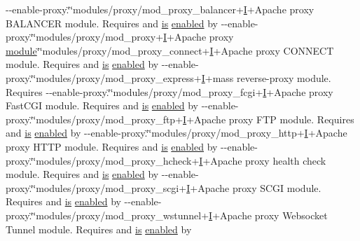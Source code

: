 \begin{DoxyCompactItemize}
-\/-\/enable-\/proxy.\char`\"{}\char`\"{}modules/proxy/mod\+\_\+proxy\+\_\+balancer+\hyperlink{apr__md5_8c_ac0eafdc9ee161b71e7af98af736952fd}{I}+Apache proxy B\+A\+L\+A\+N\+C\+ER module.  Requires and \hyperlink{NON-AUTOTOOLS-BUILD_8txt_a2569119f3fd3f0d7d7ecea3c96acb0bf}{is} \hyperlink{group__APR__Util__Bucket__Brigades_ga03e6cca0c879c0443efb431c30c14f76}{enabled} by -\/-\/enable-\/proxy.\char`\"{}\char`\"{}modules/proxy/mod\+\_\+proxy+\hyperlink{apr__md5_8c_ac0eafdc9ee161b71e7af98af736952fd}{I}+Apache proxy \hyperlink{group__APACHE__CORE__CONFIG_ga0ea4f633a5f9f88e1603aaeb1f2b2e69}{module}\char`\"{}\char`\"{}modules/proxy/mod\+\_\+proxy\+\_\+connect+\hyperlink{apr__md5_8c_ac0eafdc9ee161b71e7af98af736952fd}{I}+Apache proxy C\+O\+N\+N\+E\+CT module.  Requires and \hyperlink{NON-AUTOTOOLS-BUILD_8txt_a2569119f3fd3f0d7d7ecea3c96acb0bf}{is} \hyperlink{group__APR__Util__Bucket__Brigades_ga03e6cca0c879c0443efb431c30c14f76}{enabled} by -\/-\/enable-\/proxy.\char`\"{}\char`\"{}modules/proxy/mod\+\_\+proxy\+\_\+express+\hyperlink{apr__md5_8c_ac0eafdc9ee161b71e7af98af736952fd}{I}+mass reverse-\/proxy module. Requires -\/-\/enable-\/proxy.\char`\"{}\char`\"{}modules/proxy/mod\+\_\+proxy\+\_\+fcgi+\hyperlink{apr__md5_8c_ac0eafdc9ee161b71e7af98af736952fd}{I}+Apache proxy Fast\+C\+GI module.  Requires and \hyperlink{NON-AUTOTOOLS-BUILD_8txt_a2569119f3fd3f0d7d7ecea3c96acb0bf}{is} \hyperlink{group__APR__Util__Bucket__Brigades_ga03e6cca0c879c0443efb431c30c14f76}{enabled} by -\/-\/enable-\/proxy.\char`\"{}\char`\"{}modules/proxy/mod\+\_\+proxy\+\_\+ftp+\hyperlink{apr__md5_8c_ac0eafdc9ee161b71e7af98af736952fd}{I}+Apache proxy F\+TP module.  Requires and \hyperlink{NON-AUTOTOOLS-BUILD_8txt_a2569119f3fd3f0d7d7ecea3c96acb0bf}{is} \hyperlink{group__APR__Util__Bucket__Brigades_ga03e6cca0c879c0443efb431c30c14f76}{enabled} by -\/-\/enable-\/proxy.\char`\"{}\char`\"{}modules/proxy/mod\+\_\+proxy\+\_\+http+\hyperlink{apr__md5_8c_ac0eafdc9ee161b71e7af98af736952fd}{I}+Apache proxy H\+T\+TP module.  Requires and \hyperlink{NON-AUTOTOOLS-BUILD_8txt_a2569119f3fd3f0d7d7ecea3c96acb0bf}{is} \hyperlink{group__APR__Util__Bucket__Brigades_ga03e6cca0c879c0443efb431c30c14f76}{enabled} by -\/-\/enable-\/proxy.\char`\"{}\char`\"{}modules/proxy/mod\+\_\+proxy\+\_\+hcheck+\hyperlink{apr__md5_8c_ac0eafdc9ee161b71e7af98af736952fd}{I}+Apache proxy health check module.  Requires and \hyperlink{NON-AUTOTOOLS-BUILD_8txt_a2569119f3fd3f0d7d7ecea3c96acb0bf}{is} \hyperlink{group__APR__Util__Bucket__Brigades_ga03e6cca0c879c0443efb431c30c14f76}{enabled} by -\/-\/enable-\/proxy.\char`\"{}\char`\"{}modules/proxy/mod\+\_\+proxy\+\_\+scgi+\hyperlink{apr__md5_8c_ac0eafdc9ee161b71e7af98af736952fd}{I}+Apache proxy S\+C\+GI module.  Requires and \hyperlink{NON-AUTOTOOLS-BUILD_8txt_a2569119f3fd3f0d7d7ecea3c96acb0bf}{is} \hyperlink{group__APR__Util__Bucket__Brigades_ga03e6cca0c879c0443efb431c30c14f76}{enabled} by -\/-\/enable-\/proxy.\char`\"{}\char`\"{}modules/proxy/mod\+\_\+proxy\+\_\+wstunnel+\hyperlink{apr__md5_8c_ac0eafdc9ee161b71e7af98af736952fd}{I}+Apache proxy Websocket Tunnel module.  Requires and \hyperlink{NON-AUTOTOOLS-BUILD_8txt_a2569119f3fd3f0d7d7ecea3c96acb0bf}{is} \hyperlink{group__APR__Util__Bucket__Brigades_ga03e6cca0c879c0443efb431c30c14f76}{enabled} by 
\end{DoxyCompactItemize}
